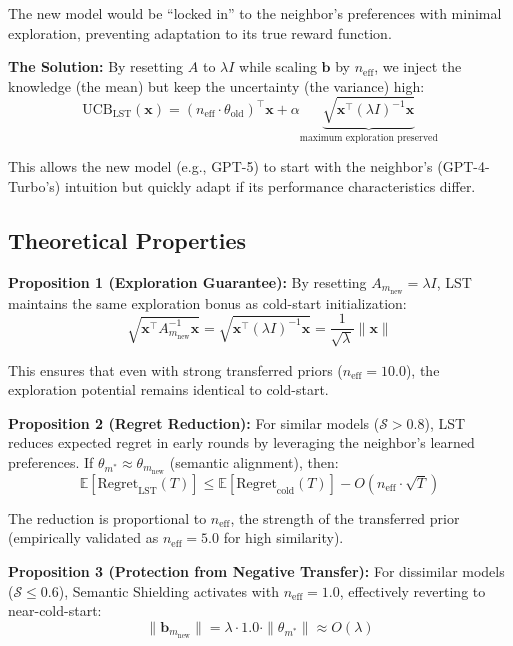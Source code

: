 \documentclass[sigconf,nonacm]{acmart}
\begin{document}
The new model would be ``locked in'' to the neighbor's preferences with minimal exploration, preventing adaptation to its true reward function.

\textbf{The Solution:} By resetting $A$ to $\lambda I$ while scaling $\mathbf{b}$ by $n_{\text{eff}}$, we inject the knowledge (the mean) but keep the uncertainty (the variance) high:
\begin{equation}
\text{UCB}_{\text{LST}}(\mathbf{x}) = (n_{\text{eff}} \cdot \theta_{\text{old}})^\top \mathbf{x} + \alpha \underbrace{\sqrt{\mathbf{x}^\top (\lambda I)^{-1} \mathbf{x}}}_{\text{maximum exploration preserved}}
\end{equation}

This allows the new model (e.g., GPT-5) to start with the neighbor's (GPT-4-Turbo's) intuition but quickly adapt if its performance characteristics differ.

\subsection{Theoretical Properties}

\textbf{Proposition 1 (Exploration Guarantee):} By resetting $A_{m_{\text{new}}} = \lambda I$, LST maintains the same exploration bonus as cold-start initialization:
\begin{equation}
\sqrt{\mathbf{x}^\top A_{m_{\text{new}}}^{-1} \mathbf{x}} = \sqrt{\mathbf{x}^\top (\lambda I)^{-1} \mathbf{x}} = \frac{1}{\sqrt{\lambda}} \|\mathbf{x}\|
\end{equation}

This ensures that even with strong transferred priors ($n_{\text{eff}} = 10.0$), the exploration potential remains identical to cold-start.

\textbf{Proposition 2 (Regret Reduction):} For similar models ($\mathcal{S} > 0.8$), LST reduces expected regret in early rounds by leveraging the neighbor's learned preferences. If $\theta_{m^*} \approx \theta_{m_{\text{new}}}$ (semantic alignment), then:
\begin{equation}
\mathbb{E}[\text{Regret}_{\text{LST}}(T)] \leq \mathbb{E}[\text{Regret}_{\text{cold}}(T)] - O(n_{\text{eff}} \cdot \sqrt{T})
\end{equation}

The reduction is proportional to $n_{\text{eff}}$, the strength of the transferred prior (empirically validated as $n_{\text{eff}} = 5.0$ for high similarity).

\textbf{Proposition 3 (Protection from Negative Transfer):} For dissimilar models ($\mathcal{S} \leq 0.6$), Semantic Shielding activates with $n_{\text{eff}} = 1.0$, effectively reverting to near-cold-start:
\begin{equation}
\|\mathbf{b}_{m_{\text{new}}}\| = \lambda \cdot 1.0 \cdot \|\theta_{m^*}\| \approx O(\lambda)
\end{equation}
\end{document}
